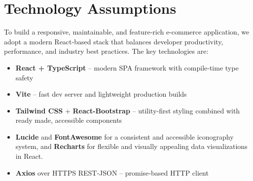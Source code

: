 \documentclass[a4paper,12pt]{article}
\begin{document}
\section{Technology Assumptions}




To build a responsive, maintainable, and feature‑rich e-commerce
application, we adopt a modern React‑based stack that balances developer
productivity, performance, and industry best practices.
The key technologies are:




\begin{itemize}
	\item \textbf{React + TypeScript} – modern SPA framework with compile‑time type safety
	\item \textbf{Vite} – fast dev server and lightweight production builds
	\item \textbf{Tailwind CSS} + \textbf{React-Bootstrap} – utility-first styling combined with ready
	made, accessible components
	\item \textbf{Lucide} and \textbf{FontAwesome} for a consistent and accessible iconography system, and \textbf{Recharts} for flexible and visually appealing data visualizations in React.
	\item \textbf{Axios} over HTTPS REST‑JSON – promise‑based HTTP client
\end{itemize}
\end{document}
